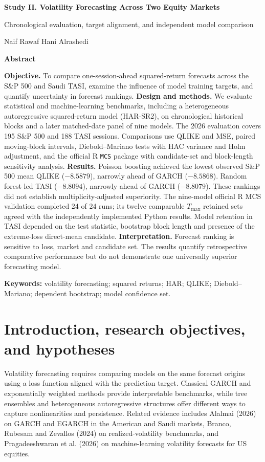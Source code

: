 
\begin{center}
{\LARGE\bfseries\color{navy} Study II. Volatility Forecasting Across Two Equity Markets}\par\vspace{7pt}
{\normalsize Chronological evaluation, target alignment, and independent model comparison}\par\vspace{12pt}
Naif Rawaf Hani Alrashedi\par\vspace{10pt}
\end{center}
\begin{center}\textbf{Abstract}\end{center}
\noindent\textbf{Objective.} To compare one-session-ahead squared-return forecasts across the S\&P 500 and Saudi TASI, examine the influence of model training targets, and quantify uncertainty in forecast rankings.
\textbf{Design and methods.} We evaluate statistical and machine-learning benchmarks, including a heterogeneous autoregressive squared-return model (HAR-SR2), on chronological historical blocks and a later matched-date panel of nine models. The 2026 evaluation covers 195 S\&P 500 and 188 TASI sessions. Comparisons use QLIKE and MSE, paired moving-block intervals, Diebold--Mariano tests with HAC variance and Holm adjustment, and the official R \texttt{MCS} package with candidate-set and block-length sensitivity analysis.
\textbf{Results.} Poisson boosting achieved the lowest observed S\&P 500 mean QLIKE ($-8.5879$), narrowly ahead of GARCH ($-8.5868$). Random forest led TASI ($-8.8094$), narrowly ahead of GARCH ($-8.8079$). These rankings did not establish multiplicity-adjusted superiority. The nine-model official R MCS validation completed 24 of 24 runs; its twelve comparable $T_{\max}$ retained sets agreed with the independently implemented Python results. Model retention in TASI depended on the test statistic, bootstrap block length and presence of the extreme-loss direct-mean candidate.
\textbf{Interpretation.} Forecast ranking is sensitive to loss, market and candidate set. The results quantify retrospective comparative performance but do not demonstrate one universally superior forecasting model.


\textbf{Keywords:} volatility forecasting; squared returns; HAR; QLIKE; Diebold--Mariano; dependent bootstrap; model confidence set.

\section{Introduction, research objectives, and hypotheses}
Volatility forecasting requires comparing models on the same forecast origins using a loss function aligned with the prediction target. Classical GARCH and exponentially weighted methods provide interpretable benchmarks, while tree ensembles and heterogeneous autoregressive structures offer different ways to capture nonlinearities and persistence. Related evidence includes Alalmai (2026) on GARCH and EGARCH in the American and Saudi markets, Branco, Rubesam and Zevallos (2024) on realized-volatility benchmarks, and Pragadeeshwaran et al. (2026) on machine-learning volatility forecasts for US equities.

